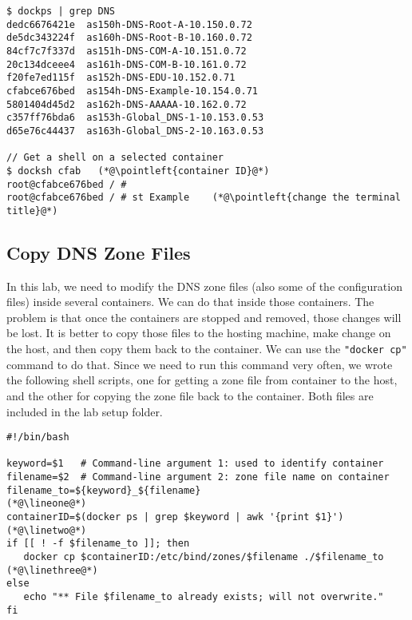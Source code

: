 \begin{lstlisting}
$ dockps | grep DNS
dedc6676421e  as150h-DNS-Root-A-10.150.0.72
de5dc343224f  as160h-DNS-Root-B-10.160.0.72
84cf7c7f337d  as151h-DNS-COM-A-10.151.0.72
20c134dceee4  as161h-DNS-COM-B-10.161.0.72
f20fe7ed115f  as152h-DNS-EDU-10.152.0.71
cfabce676bed  as154h-DNS-Example-10.154.0.71
5801404d45d2  as162h-DNS-AAAAA-10.162.0.72
c357ff76bda6  as153h-Global_DNS-1-10.153.0.53
d65e76c44437  as163h-Global_DNS-2-10.163.0.53

// Get a shell on a selected container
$ docksh cfab   (*@\pointleft{container ID}@*) 
root@cfabce676bed / #
root@cfabce676bed / # st Example    (*@\pointleft{change the terminal title}@*)
\end{lstlisting}


 

\subsection{Copy DNS Zone Files} 

In this lab, we need to modify the DNS zone files (also
some of the configuration files) inside several containers. We can do that
inside those containers. The problem is that once the containers are stopped
and removed, those changes will be lost. It is better to copy those files
to the hosting machine, make change on the host, and then copy them 
back to the container.  We can use the \texttt{"docker cp"} command
to do that. Since we need to run this command very often, we wrote 
the following shell scripts, one for getting a zone file from container
to the host, and the other for copying the zone file back 
to the container. Both files are included in the lab setup folder.

\begin{lstlisting}[caption=Getting the zone file from container: \texttt{getzone.sh}]
#!/bin/bash

keyword=$1   # Command-line argument 1: used to identify container
filename=$2  # Command-line argument 2: zone file name on container
filename_to=${keyword}_${filename}                                  (*@\lineone@*)
containerID=$(docker ps | grep $keyword | awk '{print $1}')         (*@\linetwo@*) 
if [[ ! -f $filename_to ]]; then
   docker cp $containerID:/etc/bind/zones/$filename ./$filename_to  (*@\linethree@*) 
else
   echo "** File $filename_to already exists; will not overwrite."
fi
\end{lstlisting}

